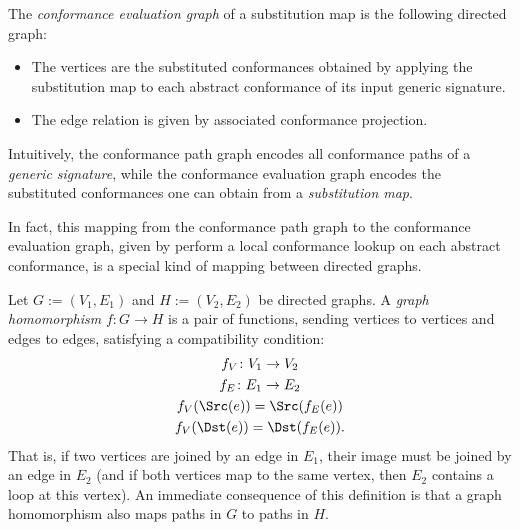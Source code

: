\documentclass[../generics]{subfiles}
\begin{document}
\begin{definition}
The \emph{conformance evaluation graph} of a substitution map is the following directed graph:
\begin{itemize}
\item The vertices are the substituted conformances obtained by applying the substitution map to each abstract conformance of its input generic signature.
\item The edge relation is given by associated conformance projection.
\end{itemize}
Intuitively, the conformance path graph encodes all conformance paths of a \emph{generic signature}, while the conformance evaluation graph encodes the substituted conformances one can obtain from a \emph{substitution map}.
\end{definition}
In fact, this mapping from the conformance path graph to the conformance evaluation graph, given by perform a local conformance lookup on each abstract conformance, is a special kind of mapping between directed graphs.
\begin{definition}
Let $G:=(V_1,E_1)$ and $H:=(V_2,E_2)$ be directed graphs. A \emph{graph homomorphism} $f\colon G\rightarrow H$ is a pair of functions, sending vertices to vertices and edges to edges, satisfying a compatibility condition:
\begin{gather*}
f_V\colon V_1\rightarrow V_2\\
f_E\colon E_1\rightarrow E_2\\
f_V(\Src(e)) = \Src(f_E(e))\\
f_V(\Dst(e)) = \Dst(f_E(e)).
\end{gather*}
That is, if two vertices are joined by an edge in $E_1$, their image must be joined by an edge in $E_2$ (and if both vertices map to the same vertex, then $E_2$ contains a loop at this vertex). An immediate consequence of this definition is that a graph homomorphism also maps paths in $G$ to paths in $H$.
\end{definition}
\end{document}
